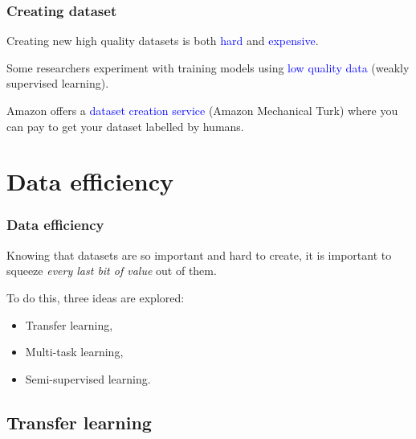 \documentclass[10pt]{beamer}
\begin{document}
\begin{frame}

  \frametitle{Creating dataset}

  Creating new high quality datasets is both \textcolor{blue}{hard}
  and \textcolor{blue}{expensive}.

  \bigskip

  Some researchers experiment with training models using
  \textcolor{blue}{low quality data} (weakly supervised learning).

  \bigskip

  Amazon offers a \textcolor{blue}{dataset creation service} (Amazon
  Mechanical Turk) where you can pay to get your dataset labelled by
  humans.

\end{frame}

\section{Data efficiency}

\begin{frame}
  \frametitle{Data efficiency}

  Knowing that datasets are so important and hard to create, it is
  important to squeeze \emph{every last bit of value} out of them.

  \bigskip

  To do this, three ideas are explored:

  \begin{itemize}
    \item Transfer learning,
    \item Multi-task learning,
    \item Semi-supervised learning.
  \end{itemize}

\end{frame}

\subsection{Transfer learning}
\end{document}
